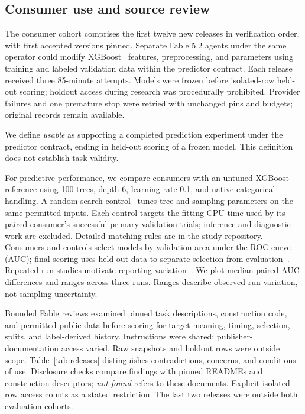 \documentclass[conference,10pt,letterpaper]{IEEEtran}
\begin{document}
\subsection{Consumer use and source review}
The consumer cohort comprises the first twelve new releases in verification order, with first accepted versions pinned. Separate Fable 5.2 agents under the same operator could modify XGBoost~\cite{xgboost} features, preprocessing, and parameters using training and labeled validation data within the predictor contract. Each release received three 85-minute attempts. Models were frozen before isolated-row held-out scoring; holdout access during research was procedurally prohibited. Provider failures and one premature stop were retried with unchanged pins and budgets; original records remain available.

We define \emph{usable} as supporting a completed prediction experiment under the predictor contract, ending in held-out scoring of a frozen model. This definition does not establish task validity.

For predictive performance, we compare consumers with an untuned XGBoost reference using 100 trees, depth 6, learning rate 0.1, and native categorical handling. A random-search control~\cite{randomsearch} tunes tree and sampling parameters on the same permitted inputs. Each control targets the fitting CPU time used by its paired consumer's successful primary validation trials; inference and diagnostic work are excluded. Detailed matching rules are in the study repository. Consumers and controls select models by validation area under the ROC curve (AUC); final scoring uses held-out data to separate selection from evaluation~\cite{cawley}. Repeated-run studies motivate reporting variation~\cite{identical-runs}. We plot median paired AUC differences and ranges across three runs. Ranges describe observed run variation, not sampling uncertainty.

Bounded Fable reviews examined pinned task descriptions, construction code, and permitted public data before scoring for target meaning, timing, selection, splits, and label-derived history. Instructions were shared; publisher-documentation access varied. Raw snapshots and holdout rows were outside scope. Table~\ref{tab:releases} distinguishes contradictions, concerns, and conditions of use. Disclosure checks compare findings with pinned READMEs and construction descriptors; \emph{not found} refers to these documents. Explicit isolated-row access counts as a stated restriction. The last two releases were outside both evaluation cohorts.
\end{document}
